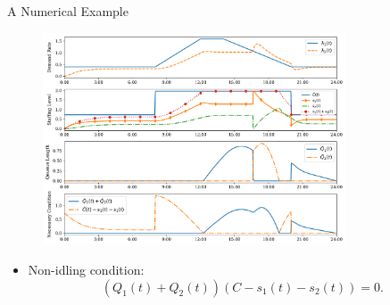 \documentclass[smaller ,table,usenames,dvipsnames]{beamer}
\newcommand{\?}{\stackrel{?}{=}}
\begin{document}
\begin{frame}{A Numerical Example}
	\begin{figure}[h!]
	\centering
	\includegraphics[width=0.8\textwidth]{./Figures/practical_exp}
	\label{fig:practical_exp}
\end{figure}
\begin{itemize}
	\item Non-idling condition:
	$$(Q_1(t)+Q_2(t))(C-s_1(t) -s_2(t))=0.$$
\end{itemize}
\end{frame}
\end{document}
